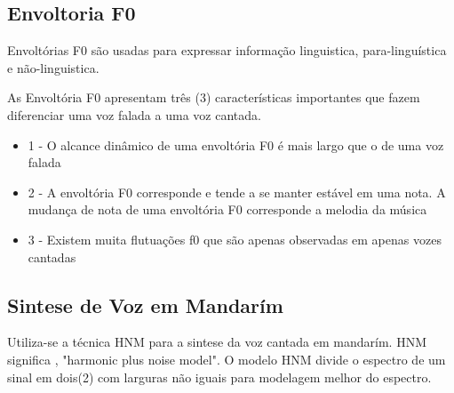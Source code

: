 	
	\subsection{Envoltoria F0}
	
	Envoltórias F0 são usadas para expressar informação linguistica, para-linguística e não-linguistica.\cite{SaitouF0}
	\linebreak
	
	As Envoltória F0 apresentam três (3) características importantes que fazem diferenciar uma voz falada a uma voz cantada.\cite{SaitouNada}
	\linebreak
	\begin{itemize}
		\item 1 - O alcance dinâmico de uma envoltória F0 é mais largo que o de uma voz falada
		\item 2 - A envoltória F0 corresponde e tende a se manter estável em uma nota. A mudança de nota de uma envoltória F0 corresponde a melodia da música
		\item 3 - Existem muita flutuações f0 que são apenas observadas em apenas vozes cantadas
	\end{itemize}
	
	
	\subsection{Sintese de Voz em Mandarím}
		Utiliza-se a técnica HNM para a sintese da voz cantada em mandarím. HNM significa , "harmonic plus noise model".
		O modelo HNM divide o espectro de um sinal em dois(2) com larguras não iguais para modelagem melhor do espectro.\cite{LinRobos}
	